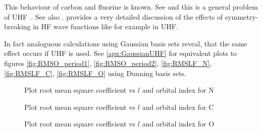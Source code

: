 This behaviour of carbon and fluorine is known.
See \citet{Cook1981}
and this is a general problem of UHF~\citet{Cook1984}.
See also \citet{McWeeny1985}.
\citet{Fukutome1981} provides a very detailed discussion of the
effects of symmetry-breaking in HF wave functions like for example in UHF.
\label{sec:IssuesUHF}
%

In fact analoguous calculations using Gaussian basis sets reveal,
that the same effect occurs if UHF is used.
See \vref{apx:GaussianUHF} for equivalent plots to figures \vref{fig:RMSO_period1},
\vref{fig:RMSO_period2},  \vref{fig:RMSLF_N}, \vref{fig:RMSLF_C}, \vref{fig:RMSLF_O}
using Dunning basis sets.





\begin{figure}
	\centering
	\caption{Plot root mean square coefficient vs $l$ and orbital index for N}
	\label{fig:RMSLF_N}
\end{figure}

\begin{figure}
	\centering
	\caption{Plot root mean square coefficient vs $l$ and orbital index for C}
	\label{fig:RMSLF_C}
\end{figure}

\begin{figure}
	\centering
	\caption{Plot root mean square coefficient vs $l$ and orbital index for O}
	\label{fig:RMSLF_O}
\end{figure}


